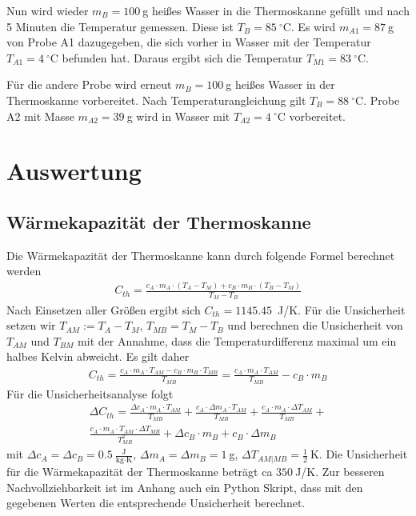 \documentclass{article}
\begin{document}
Nun wird wieder $m_B = 100~$g heißes Wasser in die Thermoskanne gefüllt und nach 5 Minuten die Temperatur gemessen. Diese ist $T_B=85~^\circ$C. Es wird $m_{A1} = 87~$g von Probe A1 dazugegeben, die sich vorher in Wasser mit der Temperatur $T_{A1} = 4~^\circ$C befunden hat. Daraus ergibt sich die Temperatur $T_{M1} = 83~^\circ$C.

Für die andere Probe wird erneut $m_B = 100~$g heißes Wasser in der Thermoskanne vorbereitet. Nach Temperaturangleichung gilt $T_B = 88~^\circ$C. Probe A2 mit Masse $m_{A2} = 39~$g wird in Wasser mit $T_{A2} = 4~^\circ$C vorbereitet.

\section{Auswertung}

\subsection{Wärmekapazität der Thermoskanne}

Die Wärmekapazität der Thermoskanne kann durch folgende Formel berechnet werden
\begin{align}
C_{th} = \frac{c_A\cdot m_A\cdot (T_A - T_M) + c_B \cdot m_B \cdot (T_B - T_M)}{T_M - T_B}
\end{align}
Nach Einsetzen aller Größen ergibt sich $C_{th} = 1145.45$~J/K. Für die Unsicherheit setzen wir $T_{AM} := T_A - T_M$, $T_{MB} = T_M-T_B$ und berechnen die Unsicherheit von $T_{AM}$ und $T_{BM}$ mit der Annahme, dass die Temperaturdifferenz maximal um ein halbes Kelvin abweicht. Es gilt daher
\begin{align}
C_{th} = \frac{c_A\cdot m_A\cdot T_{AM} - c_B \cdot m_B \cdot T_{MB}}{T_{MB}} = \frac{c_A\cdot m_A\cdot T_{AM}}{T_{MB}} - c_B\cdot m_B
\end{align}
Für die Unsicherheitsanalyse folgt
\begin{align*}
\Delta C_{th} = \frac{\Delta c_A\cdot m_A\cdot T_{AM}}{T_{MB}} + \frac{ c_A\cdot \Delta m_A\cdot T_{AM}}{T_{MB}} + \frac{ c_A\cdot m_A\cdot \Delta T_{AM}}{T_{MB}} + \\ \frac{ c_A\cdot m_A\cdot T_{AM} \cdot \Delta T_{MB}}{T_{MB}^2 } + \Delta c_B\cdot m_B + c_B\cdot \Delta m_B
\end{align*}
mit $\Delta c_A = \Delta c_B = 0.5~\frac{\text{J}}{\text{kg}\cdot\text{K}}$, $\Delta m_A = \Delta m_B = 1~$g, $\Delta T_{AM|MB} = \frac12~$K.
Die Unsicherheit für die Wärmekapazität der Thermoskanne beträgt ca $350~$J/K. Zur besseren Nachvollziehbarkeit ist im Anhang auch ein Python Skript, dass mit den gegebenen Werten die entsprechende Unsicherheit berechnet.
\end{document}

